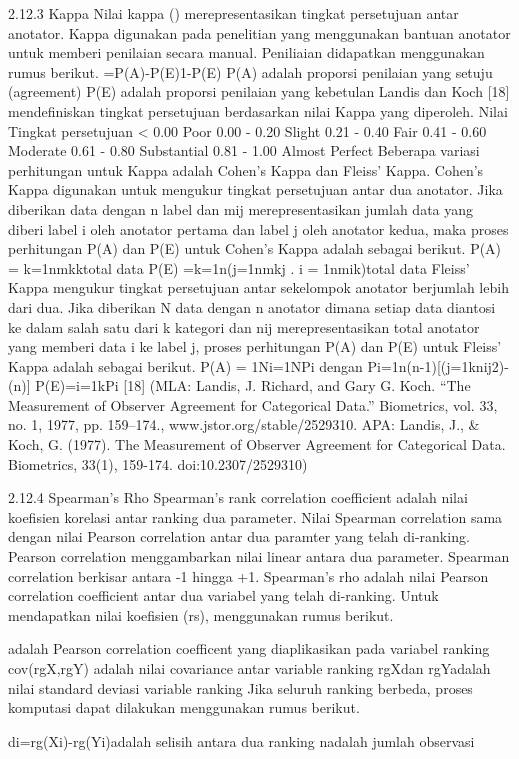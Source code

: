 2.12.3 Kappa 
Nilai kappa () merepresentasikan tingkat persetujuan antar anotator. Kappa digunakan pada penelitian yang menggunakan bantuan anotator untuk memberi penilaian secara manual. Peniliaian didapatkan menggunakan rumus berikut.
=P(A)-P(E)1-P(E)
P(A) adalah proporsi penilaian yang setuju (agreement)
P(E) adalah proporsi penilaian yang kebetulan
Landis dan Koch [18] mendefiniskan tingkat persetujuan berdasarkan nilai Kappa yang diperoleh. 
Nilai 
Tingkat persetujuan
< 0.00
Poor
0.00 - 0.20
Slight
0.21 - 0.40
Fair
0.41 - 0.60
Moderate
0.61 - 0.80
Substantial
0.81 - 1.00
Almost Perfect
Beberapa variasi perhitungan untuk Kappa adalah Cohen’s Kappa dan Fleiss’ Kappa. Cohen’s Kappa digunakan untuk mengukur tingkat persetujuan antar dua anotator. Jika diberikan data dengan n label dan mij merepresentasikan jumlah data yang diberi label i oleh anotator pertama dan label j oleh anotator kedua, maka proses perhitungan P(A) dan P(E)  untuk Cohen’s Kappa adalah sebagai berikut.
P(A) = k=1nmkktotal data
P(E) =k=1n(j=1nmkj . i = 1nmik)total data 
Fleiss’ Kappa mengukur tingkat persetujuan antar sekelompok anotator berjumlah lebih dari dua. Jika diberikan N data dengan n anotator dimana setiap data diantosi ke dalam salah satu dari k kategori dan nij merepresentasikan total anotator yang memberi data i ke label j, proses perhitungan P(A) dan P(E)  untuk Fleiss’ Kappa adalah sebagai berikut.
P(A) = 1Ni=1NPi dengan Pi=1n(n-1)[(j=1knij2)-(n)]
P(E)=i=1kPi 
[18] (MLA: Landis, J. Richard, and Gary G. Koch. “The Measurement of Observer Agreement for Categorical Data.” Biometrics, vol. 33, no. 1, 1977, pp. 159–174., www.jstor.org/stable/2529310.
APA: Landis, J., & Koch, G. (1977). The Measurement of Observer Agreement for Categorical Data. Biometrics, 33(1), 159-174. doi:10.2307/2529310)

2.12.4 Spearman’s Rho
Spearman’s rank correlation coefficient adalah nilai koefisien korelasi antar ranking dua parameter. Nilai Spearman correlation sama dengan nilai Pearson correlation antar dua paramter yang telah di-ranking. Pearson correlation  menggambarkan nilai linear antara dua parameter. Spearman correlation berkisar antara -1 hingga +1.
Spearman’s rho adalah nilai Pearson correlation coefficient antar dua variabel yang telah di-ranking. Untuk mendapatkan nilai koefisien (rs), menggunakan rumus berikut.

adalah Pearson correlation coefficent yang diaplikasikan pada variabel ranking
cov(rgX,rgY) adalah nilai covariance antar variable ranking
rgXdan rgYadalah nilai standard deviasi variable ranking
Jika seluruh ranking berbeda, proses komputasi dapat dilakukan menggunakan rumus berikut.

di=rg(Xi)-rg(Yi)adalah selisih antara dua ranking
nadalah jumlah observasi
